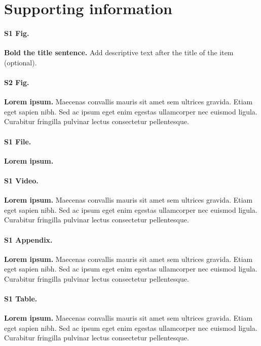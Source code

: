 \documentclass[
  10pt,
  letterpaper,
]{article}
\begin{document}
\hypertarget{supporting-information}{%
\section{Supporting information}\label{supporting-information}}

\paragraph*{S1 Fig.}
\label{s1-fig}
{\textbf{Bold the title sentence.}} Add descriptive text after the title
of the item (optional).

\paragraph*{S2 Fig.}
\label{s2-fig}
{\textbf{Lorem ipsum.}} Maecenas convallis mauris sit amet sem ultrices
gravida. Etiam eget sapien nibh. Sed ac ipsum eget enim egestas
ullamcorper nec euismod ligula. Curabitur fringilla pulvinar lectus
consectetur pellentesque.

\paragraph*{S1 File.}
\label{s1-file}
{\textbf{Lorem ipsum.}}

\paragraph*{S1 Video.}
\label{s1-video}
{\textbf{Lorem ipsum.}} Maecenas convallis mauris sit amet sem ultrices
gravida. Etiam eget sapien nibh. Sed ac ipsum eget enim egestas
ullamcorper nec euismod ligula. Curabitur fringilla pulvinar lectus
consectetur pellentesque.

\paragraph*{S1 Appendix.}
\label{s1-appendix}
{\textbf{Lorem ipsum.}} Maecenas convallis mauris sit amet sem ultrices
gravida. Etiam eget sapien nibh. Sed ac ipsum eget enim egestas
ullamcorper nec euismod ligula. Curabitur fringilla pulvinar lectus
consectetur pellentesque.

\paragraph*{S1 Table.}
\label{s1-table}
{\textbf{Lorem ipsum.}} Maecenas convallis mauris sit amet sem ultrices
gravida. Etiam eget sapien nibh. Sed ac ipsum eget enim egestas
ullamcorper nec euismod ligula. Curabitur fringilla pulvinar lectus
consectetur pellentesque.
\end{document}
